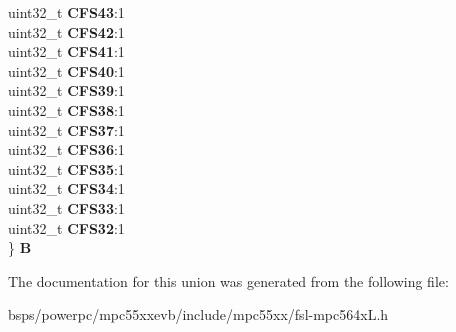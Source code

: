 \begin{DoxyCompactItemize}
\begin{tabbing}
\>uint32\_t {\bfseries CFS43}:1\\
\>uint32\_t {\bfseries CFS42}:1\\
\>uint32\_t {\bfseries CFS41}:1\\
\>uint32\_t {\bfseries CFS40}:1\\
\>uint32\_t {\bfseries CFS39}:1\\
\>uint32\_t {\bfseries CFS38}:1\\
\>uint32\_t {\bfseries CFS37}:1\\
\>uint32\_t {\bfseries CFS36}:1\\
\>uint32\_t {\bfseries CFS35}:1\\
\>uint32\_t {\bfseries CFS34}:1\\
\>uint32\_t {\bfseries CFS33}:1\\
\>uint32\_t {\bfseries CFS32}:1\\
\} {\bfseries B}\\

\end{tabbing}\end{DoxyCompactItemize}


The documentation for this union was generated from the following file\+:\begin{DoxyCompactItemize}
\item 
bsps/powerpc/mpc55xxevb/include/mpc55xx/fsl-\/mpc564x\+L.\+h\end{DoxyCompactItemize}
